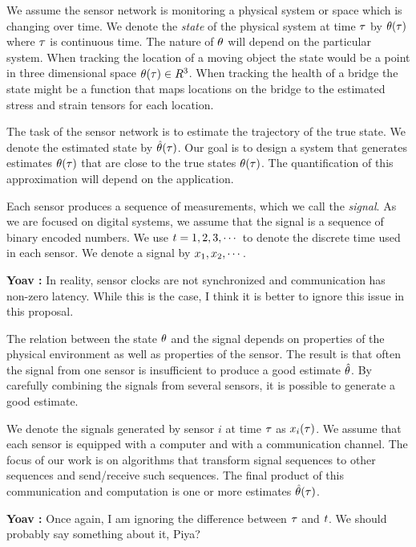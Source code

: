 \documentclass{article}
\newcommand{\comment}[3]{{\color{#1} {\bf #2 :} #3}}
\newcommand{\yoav}[1]{\comment{magenta}{Yoav}{#1}}
\begin{document}
We assume the sensor network is monitoring a physical system or space which is changing over time. We denote the {\em state} of the physical system at time $\tau$ by $\theta(\tau)$ where $\tau$ is continuous time. The nature of $\theta$ will depend on the particular system. When tracking the location of a moving object the state would be a point in three dimensional space $\theta(\tau) \in R^3$. When tracking the health of a bridge the state might be a function that maps locations on the bridge to the estimated stress and strain tensors for each location.

The task of the sensor network is to estimate the trajectory of the true state. We denote the estimated state by $\hat{\theta}(\tau)$. Our goal is to design a system that generates estimates $\theta(\tau)$ that are close to the true states $\theta(\tau)$. The quantification of this approximation will depend on the application.

Each sensor produces a sequence of measurements, which we call the {\em signal}. As we are focused on digital systems, we assume that the signal is a sequence of binary encoded numbers. We use $t =1,2,3,\cdots$ to denote the discrete time used in each sensor. We denote a signal by $x_1,x_2,\cdots$.

\yoav{In reality, sensor clocks are not synchronized and communication has non-zero latency. While this is the case, I think it is better to ignore this issue in this proposal.}

The relation between the state $\theta$ and the signal depends on properties of the physical environment as well as properties of the sensor. The result is that often the signal from one sensor is insufficient to produce a good estimate $\hat{\theta}$. By carefully combining the signals from several sensors, it is possible to generate a good estimate.

We denote the signals generated by sensor $i$ at time $\tau$ as $x_i(\tau)$. We assume that each sensor is equipped with a computer and with a communication channel. The focus of our work is on algorithms that transform signal sequences to other sequences and send/receive such sequences. The final product of this communication and computation is one or more estimates $\hat{\theta}(\tau)$.

\yoav{Once again, I am ignoring the difference between $\tau$ and $t$. We should probably say something about it, Piya?}

\iffalse
For example, the signal captured by a microphone located a few feet away from a speaker in a reverberating room will record a highly distorted signal. The distortion is a result of echoes, reverberation at resonance frequencies, as well as noise and sounds from other sources. This signal is typically not very useful for either reproduction (
\fi
\end{document}

